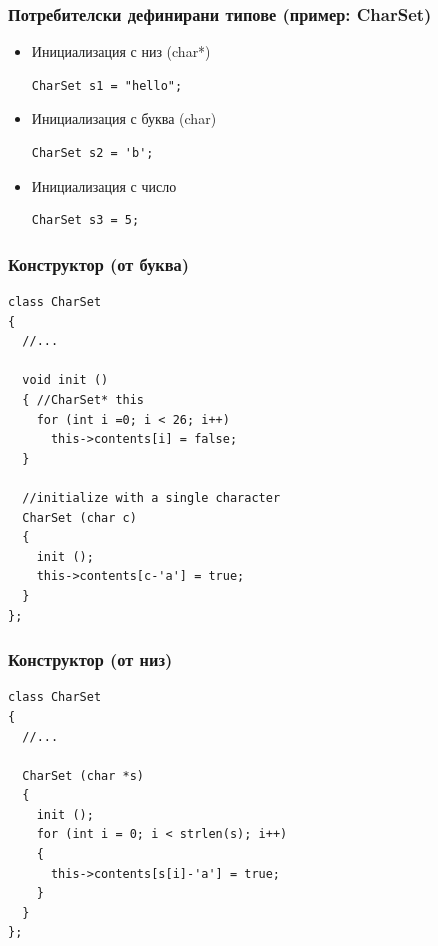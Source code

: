 \documentclass{beamer}
\begin{document}
\begin{frame}[fragile]
\frametitle{Потребителски дефинирани типове (пример: CharSet)}

\begin{itemize}
  \item Инициализация с низ (char*)

\begin{flushleft}
\begin{lstlisting}
CharSet s1 = "hello";
\end{lstlisting}  
\end{flushleft}
\pause
  \item Инициализация с буква (char)

\begin{flushleft}
\begin{lstlisting}
CharSet s2 = 'b';
\end{lstlisting}  
\end{flushleft}
\pause

  \item Инициализация с число

\begin{flushleft}
\begin{lstlisting}
CharSet s3 = 5;
\end{lstlisting}  
\end{flushleft}


\end{itemize}

\end{frame}

\begin{frame}[fragile]
\frametitle{Конструктор (от буква)}


\begin{flushleft}
\begin{lstlisting}
class CharSet
{
  //...

  void init ()
  { //CharSet* this
    for (int i =0; i < 26; i++)
      this->contents[i] = false;
  }

  //initialize with a single character
  CharSet (char c)
  {
    init ();
    this->contents[c-'a'] = true;
  }
};
\end{lstlisting}  
\end{flushleft}
\end{frame}


\begin{frame}[fragile]
\frametitle{Конструктор (от низ)}


\begin{flushleft}
\begin{lstlisting}
class CharSet
{
  //...

  CharSet (char *s)
  {
    init ();
    for (int i = 0; i < strlen(s); i++)
    {
      this->contents[s[i]-'a'] = true;
    }   
  }
};
\end{lstlisting}  
\end{flushleft}
\end{frame}
\end{document}
